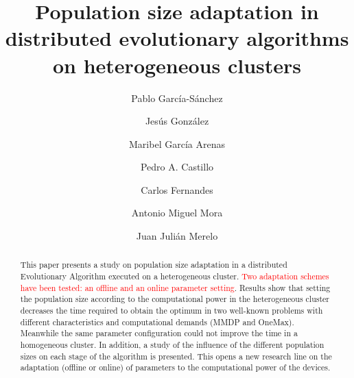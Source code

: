 \documentclass[final,1p,times]{elsarticle}
\begin{document}
\begin{frontmatter}



\title{Population size adaptation in distributed evolutionary algorithms on heterogeneous clusters}


\author[ugr]{Pablo Garc\'ia-S\'anchez}
\author[ugr]{Jes\'us Gonz\'alez}
\author[ugr]{Maribel Garc\'ia Arenas}
\author[ugr]{Pedro A. Castillo}
\author[laseeb]{Carlos Fernandes}
\author[ugr]{Antonio Miguel Mora}
\author[ugr]{Juan Juli\'an Merelo}


\address[ugr]{Department of Computer Architecture and Computer Technology and CITIC-UGR, University of Granada, Granada, Spain. Tel: +34958241778. Fax: +34958248993}
\address[laseeb]{LaSEEB-ISR-IST, Technical University of Lisbon (IST), Lisbon, Portugal}%


\begin{abstract}
This paper presents a study on population size adaptation in a distributed Evolutionary Algorithm executed on a heterogeneous cluster. \textcolor{red}{Two adaptation schemes have been tested: an offline and an online parameter setting}. Results show that setting the population size according to the computational power in the heterogeneous cluster decreases the time required to obtain the optimum in two well-known problems with different characteristics and computational demands (MMDP and OneMax). Meanwhile the same parameter configuration could not improve the time in a homogeneous cluster. In addition, a study of the influence of the different population sizes on each stage of the algorithm is presented. This opens a new research line on the adaptation (offline or online) of parameters to the computational power of the devices.


\end{abstract}
\end{frontmatter}
\end{document}
